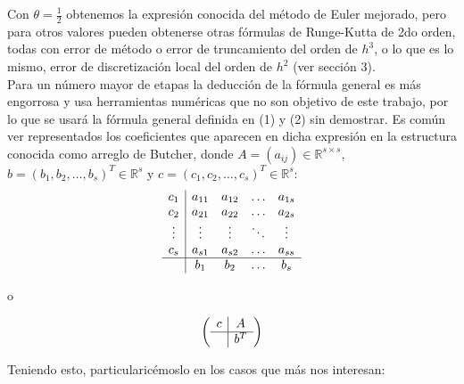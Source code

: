 \documentclass[a4paper,12pt]{article}
\begin{document}
Con \(\theta = \frac{1}{2}\) obtenemos la expresión conocida del método de Euler mejorado, pero para otros valores pueden obtenerse otras fórmulas de Runge-Kutta de 2do orden, todas con error de método o error de truncamiento del orden de \(h^3\), o lo que es lo mismo, error de discretización local del orden de \(h^2\) (ver sección 3).\\
Para un número mayor de etapas la deducción de la fórmula general es más engorrosa y usa herramientas numéricas que no son objetivo de este trabajo, por lo que se usará la fórmula general definida en (1) y (2) sin demostrar. Es común ver representados los coeficientes que aparecen en dicha expresión en la estructura conocida como arreglo de Butcher, donde \(A = (a_{ij}) \in \mathbb{R}^{s \times s}\), \(b = (b_1, b_2, \ldots, b_s)^T \in \mathbb{R}^s\) y \(c = (c_1, c_2, \ldots, c_s)^T \in \mathbb{R}^s\):
\[
\begin{array}{c|cccc}
c_1 & a_{11} & a_{12} & \ldots & a_{1s} \\
c_2 & a_{21} & a_{22} & \ldots & a_{2s} \\
\vdots & \vdots & \vdots & \ddots & \vdots \\
c_s & a_{s1} & a_{s2} & \ldots & a_{ss} \\
\hline
& b_1 & b_2 & \ldots & b_s \\
\end{array}
\]



o



\[
\left( \begin{array}{c|c}
c & A \\
\hline
& b^T \\
\end{array} \right)
\]

Teniendo esto, particularicémoslo en los casos que más nos interesan:
\end{document}
